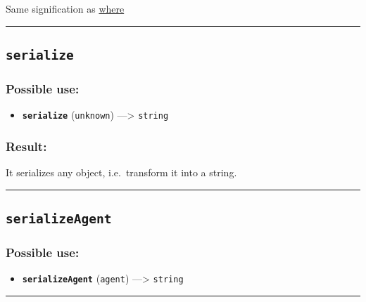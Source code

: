 \documentclass[]{book}
\providecommand{\tightlist}{%
  \setlength{\itemsep}{0pt}\setlength{\parskip}{0pt}}
\theoremstyle{definition}
\theoremstyle{definition}
\theoremstyle{definition}
\theoremstyle{remark}
\begin{document}
Same signification as \href{OperatorsSZ\#where}{where}

\begin{center}\rule{0.5\linewidth}{\linethickness}\end{center}

\subsection{\texorpdfstring{\texttt{serialize}}{serialize}}\label{serialize}

\subsubsection{Possible use:}\label{possible-use-452}

\begin{itemize}
\tightlist
\item
  \textbf{\texttt{serialize}} (\texttt{unknown}) ---\textgreater{}
  \texttt{string}
\end{itemize}

\subsubsection{Result:}\label{result-437}

It serializes any object, i.e.~transform it into a string.

\begin{center}\rule{0.5\linewidth}{\linethickness}\end{center}

\subsection{\texorpdfstring{\texttt{serializeAgent}}{serializeAgent}}\label{serializeagent}

\subsubsection{Possible use:}\label{possible-use-453}

\begin{itemize}
\tightlist
\item
  \textbf{\texttt{serializeAgent}} (\texttt{agent}) ---\textgreater{}
  \texttt{string}
\end{itemize}

\begin{center}\rule{0.5\linewidth}{\linethickness}\end{center}
\end{document}
